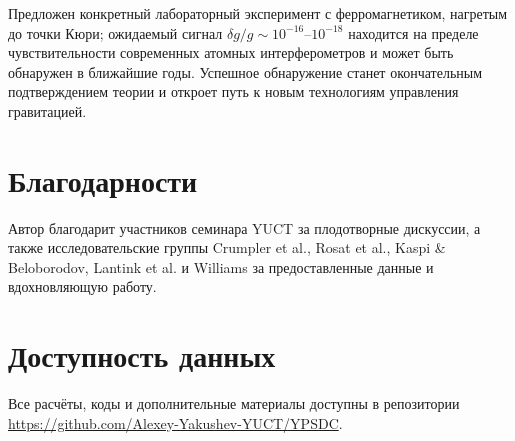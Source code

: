 \documentclass[12pt]{article}
\theoremstyle{remark}
\begin{document}
	Предложен конкретный лабораторный эксперимент с ферромагнетиком, нагретым до точки Кюри; ожидаемый сигнал $\delta g/g \sim 10^{-16}$–$10^{-18}$ находится на пределе чувствительности современных атомных интерферометров и может быть обнаружен в ближайшие годы. Успешное обнаружение станет окончательным подтверждением теории и откроет путь к новым технологиям управления гравитацией.
	
	\section*{Благодарности}
	Автор благодарит участников семинара YUCT за плодотворные дискуссии, а также исследовательские группы Crumpler et al., Rosat et al., Kaspi \& Beloborodov, Lantink et al. и Williams за предоставленные данные и вдохновляющую работу.
	
	\section*{Доступность данных}
	Все расчёты, коды и дополнительные материалы доступны в репозитории \url{https://github.com/Alexey-Yakushev-YUCT/YPSDC}.
	
\end{document}
